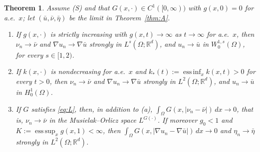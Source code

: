 \documentclass[11pt]{amsart}
\newtheorem{maintheorem}{Theorem}
\theoremstyle{definition}
\theoremstyle{remark}
\numberwithin{equation}{section}
\newcommand{\R}{\mathbb{R}}
\newcommand{\dx}{\,dx}
\newcommand{\abs}[1]{\lvert #1\rvert}
\DeclareMathOperator*{\esssup}{ess\,sup}
\DeclareMathOperator*{\essinf}{ess\,inf}
\begin{document}
\begin{maintheorem}\label{thm:B}
Assume \textup{(S)} and that $G(x,\cdot)\in C^1([0,\infty))$ with $g(x,0)=0$ for a.e.\ $x$; let $(\bar u,\bar\nu,\bar\eta)$ be the limit in Theorem~\ref{thm:A}.
\begin{enumerate}[label=\textup{(\alph*)}]
\item If $g(x,\cdot)$ is strictly increasing with $g(x,t)\to\infty$ as $t\to\infty$ for a.e.\ $x$, then $\nu_n\to\bar\nu$ and $\nabla u_n\to\nabla\bar u$ strongly in $L^s(\Omega;\R^d)$, and $u_n\to\bar u$ in $W^{1,s}_0(\Omega)$, for every $s\in[1,2)$.
\item If $k(x,\cdot)$ is nondecreasing for a.e.\ $x$ and $k_*(t):=\essinf_xk(x,t)>0$ for every $t>0$, then $\nu_n\to\bar\nu$ and $\nabla u_n\to\nabla\bar u$ strongly in $L^2(\Omega;\R^d)$, and $u_n\to\bar u$ in $H^1_0(\Omega)$.
\item If $G$ satisfies \eqref{eq:L}, then, in addition to \textup{(a)}, $\int_\Omega G(x,\abs{\nu_n-\bar\nu})\dx\to0$, that is, $\nu_n\to\bar\nu$ in the Musielak--Orlicz space $L^{G(\cdot)}$. If moreover $g_0<1$ and $K:=\esssup_xg(x,1)<\infty$, then $\int_\Omega G(x,\abs{\nabla u_n-\nabla\bar u})\dx\to0$ and $\eta_n\to\bar\eta$ strongly in $L^2(\Omega;\R^d)$.
\end{enumerate}
\end{maintheorem}
\end{document}
